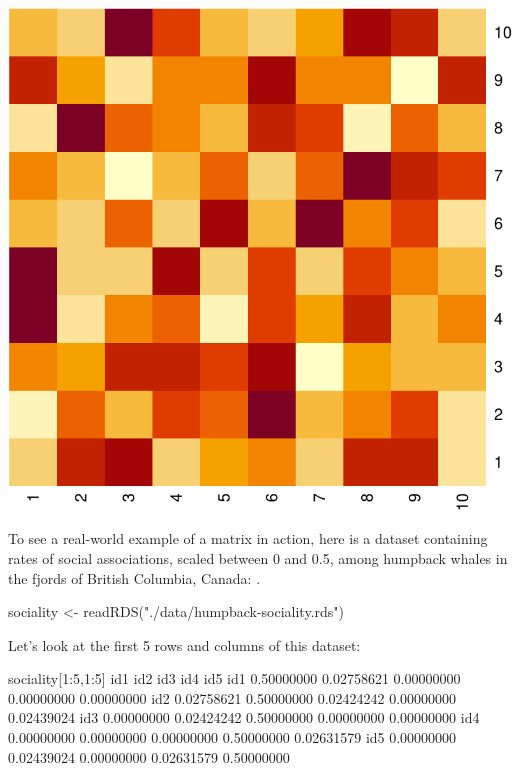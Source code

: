 \documentclass[
]{book}
\newenvironment{Shaded}{\begin{snugshade}}{\end{snugshade}}
\newcommand{\DecValTok}[1]{\textcolor[rgb]{0.00,0.00,0.81}{#1}}
\newcommand{\FloatTok}[1]{\textcolor[rgb]{0.00,0.00,0.81}{#1}}
\newcommand{\FunctionTok}[1]{\textcolor[rgb]{0.00,0.00,0.00}{#1}}
\newcommand{\NormalTok}[1]{#1}
\newcommand{\OtherTok}[1]{\textcolor[rgb]{0.56,0.35,0.01}{#1}}
\newcommand{\SpecialCharTok}[1]{\textcolor[rgb]{0.00,0.00,0.00}{#1}}
\newcommand{\StringTok}[1]{\textcolor[rgb]{0.31,0.60,0.02}{#1}}
\begin{document}
\includegraphics{figures/unnamed-chunk-387-1.pdf}

To see a real-world example of a matrix in action, here is a dataset containing rates of social associations, scaled between 0 and 0.5, among humpback whales in the fjords of British Columbia, Canada: .

\begin{Shaded}
\begin{Highlighting}[]
\NormalTok{sociality }\OtherTok{\textless{}{-}} \FunctionTok{readRDS}\NormalTok{(}\StringTok{"./data/humpback{-}sociality.rds"}\NormalTok{)}
\end{Highlighting}
\end{Shaded}

Let's look at the first 5 rows and columns of this dataset:

\begin{Shaded}
\begin{Highlighting}[]
\NormalTok{sociality[}\DecValTok{1}\SpecialCharTok{:}\DecValTok{5}\NormalTok{,}\DecValTok{1}\SpecialCharTok{:}\DecValTok{5}\NormalTok{]}
\NormalTok{           id1        id2        id3        id4        id5}
\NormalTok{id1 }\FloatTok{0.50000000} \FloatTok{0.02758621} \FloatTok{0.00000000} \FloatTok{0.00000000} \FloatTok{0.00000000}
\NormalTok{id2 }\FloatTok{0.02758621} \FloatTok{0.50000000} \FloatTok{0.02424242} \FloatTok{0.00000000} \FloatTok{0.02439024}
\NormalTok{id3 }\FloatTok{0.00000000} \FloatTok{0.02424242} \FloatTok{0.50000000} \FloatTok{0.00000000} \FloatTok{0.00000000}
\NormalTok{id4 }\FloatTok{0.00000000} \FloatTok{0.00000000} \FloatTok{0.00000000} \FloatTok{0.50000000} \FloatTok{0.02631579}
\NormalTok{id5 }\FloatTok{0.00000000} \FloatTok{0.02439024} \FloatTok{0.00000000} \FloatTok{0.02631579} \FloatTok{0.50000000}
\end{Highlighting}
\end{Shaded}
\end{document}
